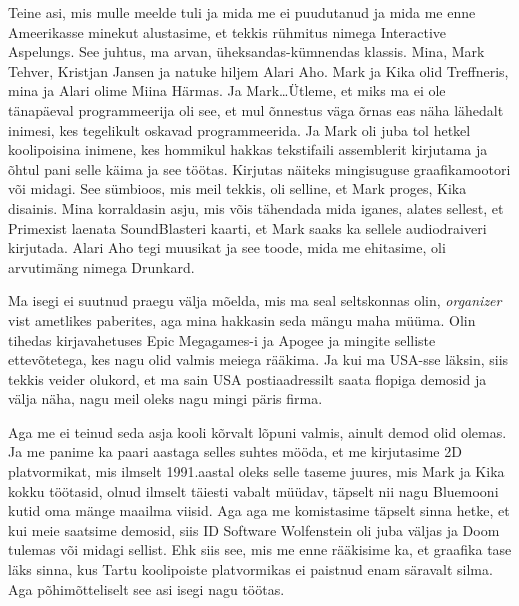 Teine asi, mis mulle meelde tuli ja mida me ei puudutanud ja mida me enne 
Ameerikasse minekut alustasime, et tekkis rühmitus nimega Interactive 
Aspelungs. See juhtus, ma arvan,  
üheksandas-kümnendas klassis.  Mina, Mark Tehver, 
Kristjan Jansen ja natuke hiljem Alari 
Aho. Mark ja Kika olid 
Treffneris, mina ja Alari olime Miina 
Härmas. Ja Mark\ldots Ütleme, et miks ma 
ei ole tänapäeval programmeerija oli see, et mul õnnestus väga õrnas eas näha 
lähedalt inimesi, kes tegelikult oskavad programmeerida. Ja Mark oli juba tol 
hetkel koolipoisina inimene, kes hommikul hakkas tekstifaili assemblerit 
kirjutama ja õhtul pani selle käima ja see töötas. Kirjutas näiteks mingisuguse 
graafikamootori või midagi. See sümbioos, mis meil tekkis, oli selline, et 
Mark proges, Kika disainis. Mina korraldasin asju, mis võis tähendada mida 
iganes, alates sellest, et Primexist laenata SoundBlasteri kaarti, et Mark 
saaks ka sellele audiodraiveri kirjutada. Alari Aho tegi muusikat ja see toode, 
mida me ehitasime, oli arvutimäng nimega Drunkard.

Ma isegi ei suutnud praegu välja mõelda, mis ma seal seltskonnas olin, 
\emph{organizer} vist  ametlikes paberites, aga  mina hakkasin seda mängu maha 
müüma. Olin tihedas kirjavahetuses Epic Megagames-i ja Apogee ja mingite 
selliste ettevõtetega, kes nagu  olid valmis meiega rääkima.  Ja 
kui ma USA-sse läksin, siis tekkis  veider olukord, et ma sain USA 
postiaadressilt saata flopiga demosid ja välja näha, nagu meil oleks nagu mingi 
päris firma. 

Aga me ei teinud seda asja kooli kõrvalt lõpuni valmis, ainult demod olid 
olemas. Ja me panime ka paari aastaga selles suhtes mööda, et me kirjutasime 2D 
platvormikat, mis ilmselt 1991.aastal oleks selle taseme juures, mis 
Mark ja Kika  kokku 
töötasid, olnud ilmselt täiesti vabalt müüdav, täpselt nii nagu 
Bluemooni kutid oma mänge maailma viisid. Aga aga me 
komistasime täpselt sinna hetke, et kui meie saatsime demosid, siis  ID 
Software Wolfenstein oli juba 
väljas ja Doom 
tulemas või midagi sellist. Ehk siis see, mis 
me enne rääkisime ka, et graafika tase läks sinna, kus Tartu koolipoiste 
platvormikas ei paistnud enam säravalt silma. Aga põhimõtteliselt see asi isegi 
nagu töötas.

